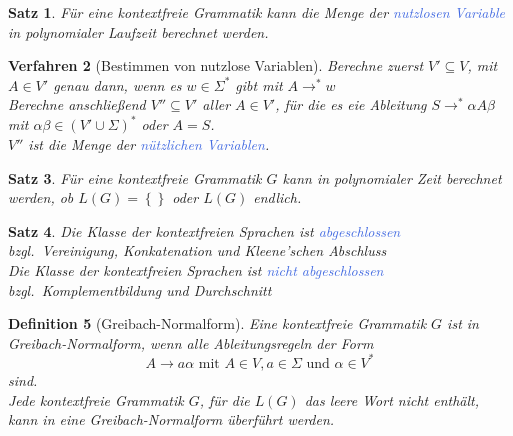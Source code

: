 \documentclass[11pt]{scrartcl}
\newcommand{\tcol}[1]{\textcolor{RoyalBlue}{#1}}
\newcommand{\set}[1]{\left\lbrace #1\right\rbrace}
\theoremstyle{break}
\newtheorem{satz}{Satz}[section]
\newtheorem{defi}[satz]{Definition}
\newtheorem{verf}[satz]{Verfahren}
\begin{document}
    \begin{satz}
        Für eine kontextfreie Grammatik kann die Menge der \tcol{nutzlosen Variable} in polynomialer Laufzeit berechnet werden.
    \end{satz}

    \begin{verf}[Bestimmen von nutzlose Variablen]
        Berechne zuerst $V'\subseteq V$, mit $A\in V'$ genau dann, wenn es $w\in\Sigma^*$ gibt mit $A\rightarrow^*w$\\
        Berechne anschließend $V''\subseteq V'$ aller $A\in V'$, für die es eie Ableitung $S\rightarrow^*\alpha A\beta$ mit $\alpha\beta\in(V'\cup\Sigma)^*$ oder $A=S$.\\
        $V''$ ist die Menge der \tcol{nützlichen Variablen}.
    \end{verf}

    \begin{satz}
        Für eine kontextfreie Grammatik $G$ kann in polynomialer Zeit berechnet werden, ob $L(G)=\set{}$ oder $L(G)$ endlich.
    \end{satz}

    \begin{satz}
        Die Klasse der kontextfreien Sprachen ist \tcol{abgeschlossen} bzgl.\ Vereinigung, Konkatenation und Kleene'schen Abschluss\\
        Die Klasse der kontextfreien Sprachen ist \tcol{nicht abgeschlossen} bzgl.\ Komplementbildung und Durchschnitt\\
    \end{satz}

    \begin{defi}[Greibach-Normalform]
        Eine kontextfreie Grammatik $G$ ist in Greibach-Normalform, wenn alle Ableitungsregeln der Form
        \[A\rightarrow a\alpha\text{ mit }A\in V,a\in\Sigma\text{ und }\alpha\in V^*\]
        sind.\\
        Jede kontextfreie Grammatik $G$, für die $L(G)$ das leere Wort nicht enthält, kann in eine Greibach-Normalform überführt werden.
    \end{defi}

\end{document}
